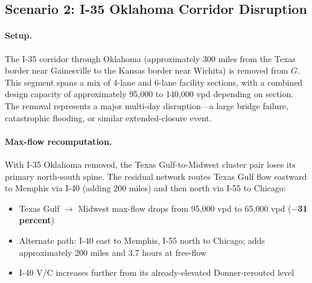 \subsection{Scenario 2: I-35 Oklahoma Corridor Disruption}

\paragraph{Setup.} The I-35 corridor through Oklahoma (approximately 300 miles from the Texas border near Gainesville to the Kansas border near Wichita) is removed from $G$. This segment spans a mix of 4-lane and 6-lane facility sections, with a combined design capacity of approximately 95,000 to 140,000 vpd depending on section. The removal represents a major multi-day disruption---a large bridge failure, catastrophic flooding, or similar extended-closure event.

\paragraph{Max-flow recomputation.} With I-35 Oklahoma removed, the Texas Gulf-to-Midwest cluster pair loses its primary north-south spine. The residual network routes Texas Gulf flow eastward to Memphis via I-40 (adding 200 miles) and then north via I-55 to Chicago:
\begin{itemize}
  \item Texas Gulf $\to$ Midwest max-flow drops from 95,000 vpd to 65,000 vpd (\textbf{$-$31 percent})
  \item Alternate path: I-40 east to Memphis, I-55 north to Chicago; adds approximately 200 miles and 3.7 hours at free-flow
  \item I-40 V/C increases further from its already-elevated Donner-rerouted level
\end{itemize}

